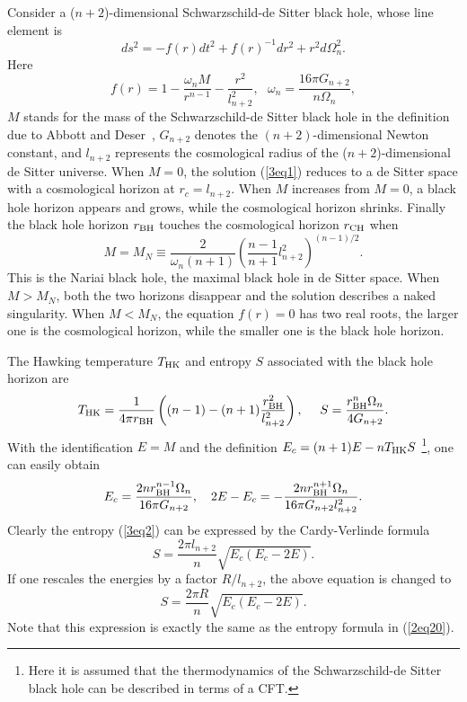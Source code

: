 \documentclass[a4paper,12pt]{article}
\begin{document}
Consider a ($n+2$)-dimensional Schwarzschild-de Sitter black hole,
whose line element is
\begin{equation}
\label{3eq1} ds^2 =- f(r) dt^2 +f(r)^{-1}dr^2 +r^2 d\Omega_{n}^2.
\end{equation}
Here
$$ f(r) =1 -\frac{\omega_n M}{r^{n-1}} -\frac{r^2}{l_{n+2}^2}, \ \ \
 \omega_n=\frac{16\pi G_{n+2}}{n \Omega_n},$$
$M$ stands for the mass of the Schwarzschild-de Sitter black hole
in the definition due to Abbott and Deser~\cite{AD}, $G_{n+2}$
denotes the $(n+2)$-dimensional Newton constant, and
$l_{n+2}$ represents the cosmological radius of the
($n+2$)-dimensional de Sitter universe. When $M=0$, the solution
(\ref{3eq1}) reduces to a  de Sitter space with a cosmological
horizon at $r_c=l_{n+2}$. When $M$ increases from $M=0$, a black
hole horizon appears and grows, while the cosmological horizon shrinks. 
Finally the black hole horizon $r_{\rm BH}$ touches the cosmological 
horizon $r_{\rm CH}$ when
$$ M =M_N \equiv \frac{2}{\omega_n (n+1)}\left
(\frac{n-1}{n+1}l^2_{n+2}\right)^{(n-1)/2}.$$
 This is the Nariai black hole, the maximal black hole in de
 Sitter space. When $M >M_N$, both the two horizons disappear and
 the solution describes a naked singularity. When $M <M_N$, the
 equation $f(r)=0$ has two real roots, the larger one is the
 cosmological horizon, while the smaller one is the black hole
 horizon.

  
The Hawking temperature $T_{\rm HK}$ and entropy $S$ associated with the
  black hole horizon are~\cite{Cai2}
  \begin{equation}
  \label{3eq2}
  T_{\rm HK} =\frac{1}{4\pi
  r_{\rm BH}}\left((n-1)-(n+1)\frac{r_{\rm BH}^2}{l^2_{n+2}}\right), \ \ \ \
 S =\frac{r_{\rm BH}^n \Omega_n}{4G_{n+2}}.
\end{equation}
With the identification $E=M$ and the definition
$E_c=(n+1)E-nT_{\rm HK}S~$\footnote{Here it is assumed that the
thermodynamics of the Schwarzschild-de Sitter black hole can be
described in terms of a CFT.}, one can easily obtain
\begin{equation}
 E_c =\frac{2nr_{\rm BH}^{n-1}\Omega_n}{16\pi G_{n+2}}, \ \ \
 2E-E_c =-\frac{2n r_{\rm BH}^{n+1} \Omega_n}{16\pi G_{n+2}l^2_{n+2}}.
 \end{equation}
Clearly the entropy (\ref{3eq2}) can be expressed by the
Cardy-Verlinde formula~\cite{Cai2}
\begin{equation}
S =\frac{2\pi l_{n+2}}{n} \sqrt{E_c (E_c-2E)}.
\end{equation}
If one rescales the energies by a factor $R/l_{n+2}$, the above equation
is changed to
\begin{equation}
\label{3eq5} S =\frac{2\pi R}{n}\sqrt{E_c(E_c-2E)}.
\end{equation}
Note that this expression is  exactly the same as the entropy formula in
(\ref{2eq20}).
\end{document}
